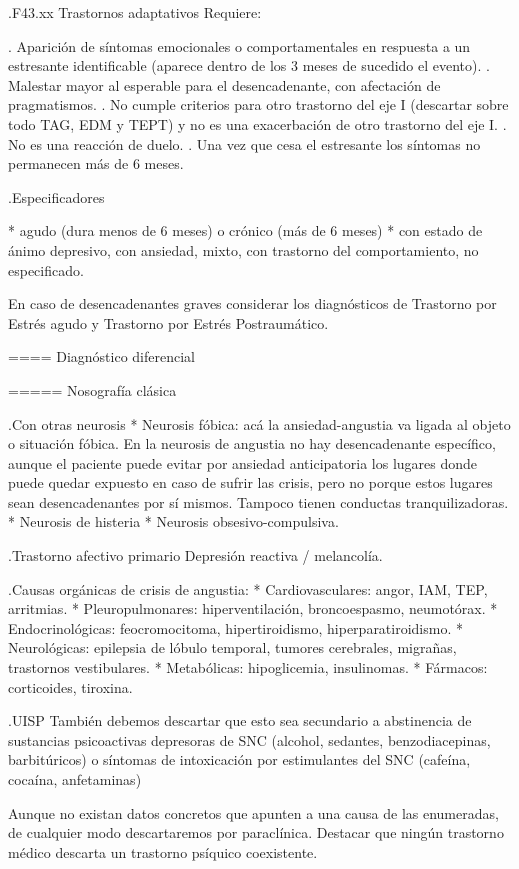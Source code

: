 \documentclass{scrbook}
\begin{document}
.F43.xx Trastornos adaptativos
Requiere:

. Aparición de síntomas emocionales o comportamentales en respuesta a un estresante identificable (aparece dentro de los 3 meses de sucedido el evento).
. Malestar mayor al esperable para el desencadenante, con afectación de pragmatismos.
. No cumple criterios para otro trastorno del eje I (descartar sobre todo TAG, EDM y TEPT) y no es una exacerbación de otro trastorno del eje I.
. No es una reacción de duelo.
. Una vez que cesa el estresante los síntomas no permanecen más de 6 meses.

.Especificadores

* agudo (dura menos de 6 meses) o crónico (más de 6 meses)
* con estado de ánimo depresivo, con ansiedad, mixto, con trastorno del comportamiento, no especificado.

En caso de desencadenantes graves considerar los diagnósticos de Trastorno por Estrés agudo y Trastorno por Estrés Postraumático.

==== Diagnóstico diferencial

===== Nosografía clásica

.Con otras neurosis
* Neurosis fóbica: acá la ansiedad-angustia va ligada al objeto o situación fóbica. En la neurosis de angustia no hay desencadenante específico, aunque el paciente puede evitar por ansiedad anticipatoria los lugares donde puede quedar expuesto en caso de sufrir las crisis, pero no porque estos lugares sean desencadenantes por sí mismos. Tampoco tienen conductas tranquilizadoras.
* Neurosis de histeria
* Neurosis obsesivo-compulsiva.

.Trastorno afectivo primario
Depresión reactiva / melancolía.

.Causas orgánicas de crisis de angustia:
* Cardiovasculares: angor, IAM, TEP, arritmias.
* Pleuropulmonares: hiperventilación, broncoespasmo, neumotórax.
* Endocrinológicas: feocromocitoma, hipertiroidismo, hiperparatiroidismo.
* Neurológicas: epilepsia de lóbulo temporal, tumores cerebrales, migrañas, trastornos vestibulares.
* Metabólicas: hipoglicemia, insulinomas.
* Fármacos: corticoides, tiroxina.

.UISP
También debemos descartar que esto sea secundario a abstinencia de sustancias psicoactivas depresoras de SNC (alcohol, sedantes, benzodiacepinas, barbitúricos) o síntomas de intoxicación por estimulantes del SNC (cafeína, cocaína, anfetaminas)

Aunque no existan datos concretos que apunten a una causa de las enumeradas, de cualquier modo descartaremos por paraclínica. Destacar que ningún trastorno médico descarta un trastorno psíquico coexistente.
\end{document}
